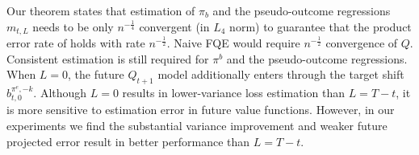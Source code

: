 \documentclass[opre,nonblindrev]{informs4}
\newcommand{\az}[1]{{\color{purple} [\textbf{az:}~#1]}}
\newcommand{\norm}[1]{\lVert#1\rVert}
\providecommand{\mathscr}{\mathcal}
\newcommand{\blipadv}{\tau}
\begin{document}



 Our theorem states that estimation of $\pi_b$ and the pseudo-outcome regressions $m_{t,L}$ needs to be only $n^{-\frac 14}$ convergent (in $L_4$ norm) to guarantee that the product error rate of  holds with rate $n^{-\frac 12}$. Naive FQE would require $n^{-\frac 12}$ convergence of $Q$. Consistent estimation is still required for $\pi^b$ and the pseudo-outcome regressions. When $L=0$, the future $Q_{t+1}$ model additionally enters through the target shift $b_{t,0}^{\pi^e,-k}$. Although $L=0$ results in lower-variance loss estimation than $L=T-t$, it is more sensitive to estimation error in future value functions. However, in our experiments we find the substantial variance improvement and weaker future projected error result in better performance than $L=T-t$.
\end{document}
